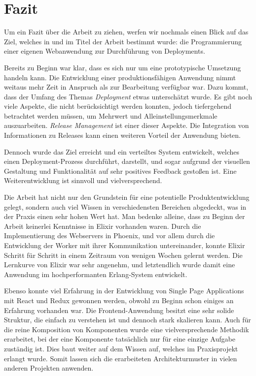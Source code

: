 \chapter{Fazit}

Um ein Fazit über die Arbeit zu ziehen, werfen wir nochmals einen Blick auf das Ziel, welches in  und im Titel der Arbeit bestimmt wurde: die Programmierung einer eigenen Webanwendung zur Durchführung von Deployments.

Bereits zu Beginn war klar, dass es sich nur um eine prototypische Umsetzung handeln kann. Die Entwicklung einer produktionsfähigen Anwendung nimmt weitaus mehr Zeit in Anspruch als zur Bearbeitung verfügbar war. Dazu kommt, dass der Umfang des Themas \emph{Deployment} etwas unterschätzt wurde. Es gibt noch viele Aspekte, die nicht berücksichtigt werden konnten, jedoch tiefergehend betrachtet werden müssen, um Mehrwert und Alleinstellungsmerkmale auszuarbeiten. \emph{Release Management} ist einer dieser Aspekte. Die Integration von Informationen zu Releases kann einen weiteren Vorteil der Anwendung bieten.

Dennoch wurde das Ziel erreicht und ein verteiltes System entwickelt, welches einen Deployment-Prozess durchführt, darstellt, und sogar aufgrund der visuellen Gestaltung und Funktionalität auf sehr positives Feedback gestoßen ist. Eine Weiterentwicklung ist sinnvoll und vielversprechend.

Die Arbeit hat nicht nur den Grundstein für eine potentielle Produktentwicklung gelegt, sondern auch viel Wissen in verschiedensten Bereichen abgedeckt, was in der Praxis einen sehr hohen Wert hat. Man bedenke alleine, dass zu Beginn der Arbeit keinerlei Kenntnisse in Elixir vorhanden waren. Durch die Implementierung des Webservers in Phoenix, und vor allem durch die Entwicklung der Worker mit ihrer Kommunikation untereinander, konnte Elixir Schritt für Schritt in einem Zeitraum von wenigen Wochen gelernt werden. Die Lernkurve von Elixir war sehr angenehm, und letztendlich wurde damit eine Anwendung im hochperformanten Erlang-System entwickelt.

Ebenso konnte viel Erfahrung in der Entwicklung von Single Page Applications mit React und Redux gewonnen werden, obwohl zu Beginn schon einiges an Erfahrung vorhanden war. Die Frontend-Anwendung besitzt eine sehr solide Struktur, die einfach zu verstehen ist und dennoch stark skalieren kann. Auch für die reine Komposition von Komponenten wurde eine vielversprechende Methodik erarbeitet, bei der eine Komponente tatsächlich nur für eine einzige Aufgabe zuständig ist. Dies baut weiter auf dem Wissen auf, welches im Praxisprojekt \citep{Maemecke2017} erlangt wurde. Somit lassen sich die erarbeiteten Architekturmuster in vielen anderen Projekten anwenden.

